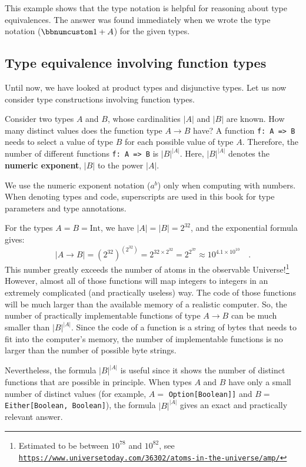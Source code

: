 This example shows that the type notation is helpful for reasoning
about type equivalences. The answer was found immediately when we
wrote the type notation ($\bbnum 1+A$) for the given types.

\subsection{Type equivalence involving function types}

Until now, we have looked at product types and disjunctive types.
Let us now consider type constructions involving function types.

Consider two types $A$ and $B$, whose cardinalities $\left|A\right|$
and $\left|B\right|$ are known. How many distinct values does the
function type $A\rightarrow B$ have? A function \lstinline!f: A => B!
needs to select a value of type $B$ for each possible value of type
$A$. Therefore, the number of different functions \lstinline!f: A => B!
is $\left|B\right|^{\left|A\right|}$. Here, $\left|B\right|^{\left|A\right|}$
denotes the \textbf{numeric exponent}, $\left|B\right|$
to the power $\left|A\right|$.

We use the numeric exponent notation ($a^{b}$) only when computing
with numbers. When denoting types and code, superscripts are used
in this book for type parameters and type annotations.

For the types $A=B=\text{Int}$, we have $\left|A\right|=\left|B\right|=2^{32}$,
and the exponential formula gives:
\[
\left|A\rightarrow B\right|=(2^{32})^{\left(2^{32}\right)}=2^{32\times2^{32}}=2^{2^{37}}\approx10^{4.1\times10^{10}}\quad.
\]
This number greatly exceeds the number of atoms in the observable
Universe!\footnote{Estimated to be between $10^{78}$ and $10^{82}$, see \texttt{\href{https://www.universetoday.com/36302/atoms-in-the-universe/amp/}{https://www.universetoday.com/36302/atoms-in-the-universe/amp/}}}
However, almost all of those functions will map integers to integers
in an extremely complicated (and practically useless) way. The code
of those functions will be much larger than the available memory of
a realistic computer. So, the number of practically implementable
functions of type $A\rightarrow B$ can be much smaller than $\left|B\right|^{\left|A\right|}$.
Since the code of a function is a string of bytes that needs to fit
into the computer\textsf{'}s memory, the number of implementable functions
is no larger than the number of possible byte strings.

Nevertheless, the formula $\left|B\right|^{\left|A\right|}$ is useful
since it shows the number of distinct functions that are possible
in principle. When types $A$ and $B$ have only a small number of
distinct values (for example, $A=$ \lstinline!Option[Boolean]]!
and $B=$ \lstinline!Either[Boolean, Boolean]!), the formula $\left|B\right|^{\left|A\right|}$
gives an exact and practically relevant answer.


